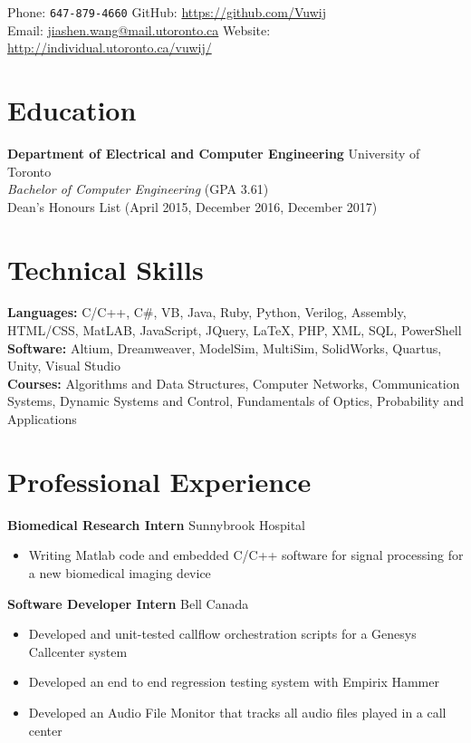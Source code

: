 \documentclass[10pt, a4paper]{cv}
\begin{document}

Phone: \texttt{647-879-4660} \hfill
GitHub: \href{https://github.com/Vuwij}{https://github.com/Vuwij}\\
Email: \href{mailto:jiashen.wang@mail.utoronto.ca}{jiashen.wang@mail.utoronto.ca}\hfill
Website: \href{http://individual.utoronto.ca/vuwij/}{http://individual.utoronto.ca/vuwij/}\\

\section*{Education}
\textbf{Department of Electrical and Computer Engineering} \hfill University of Toronto\\
\emph{Bachelor of Computer Engineering} \small{\textsc{(GPA 3.61)}}\\[0.1mm]
\small Dean's Honours List (April 2015, December 2016, December 2017)

\section*{Technical Skills}
\textbf{Languages:} C/C++, C\#, VB, Java, Ruby, Python, Verilog, Assembly, HTML/CSS, MatLAB, JavaScript, JQuery, LaTeX, PHP, XML, SQL, PowerShell\\[0.2em]
\textbf{Software:} Altium, Dreamweaver, ModelSim, MultiSim, SolidWorks, Quartus, Unity, Visual Studio\\[0.2em]
\textbf{Courses:} Algorithms and Data Structures, Computer Networks, Communication Systems, Dynamic Systems and Control, Fundamentals of Optics, Probability and Applications

\section*{Professional Experience}\noindent

	\textbf{Biomedical Research Intern} \hfill Sunnybrook Hospital
	\begin{itemize}
		\item Writing Matlab code and embedded C/C++ software for signal processing for a new biomedical imaging device
	\end{itemize}
	
	\textbf{Software Developer Intern} \hfill Bell Canada
	\begin{itemize}
		\item Developed and unit-tested callflow orchestration scripts for a Genesys Callcenter system
		\item Developed an end to end regression testing system with Empirix Hammer
		\item Developed an Audio File Monitor that tracks all audio files played in a call center
	\end{itemize}
	
\end{document}
